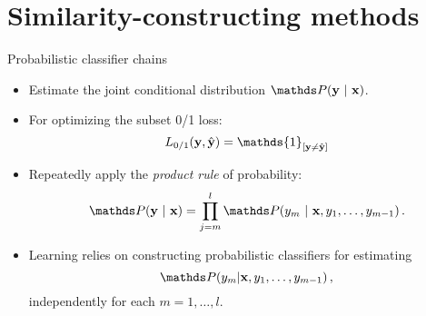 \documentclass[11pt,compress,t,notes=noshow, xcolor=table]{beamer}
\begin{document}
\section{Similarity-constructing methods}

\begin{frame}{Probabilistic classifier chains}
	
	\begin{itemize}
		\item Estimate the \alert{joint} conditional distribution $\P(\yv ~|~  \xv)$. 
		\item For optimizing the \alert{subset 0/1} loss:  $$ L_{0/1}(\yv, \hat{\yv}) = \mathds{1}_{[\yv \ne \hat{\yv}]}$$
		\item Repeatedly apply the \emph{product rule} of probability:
		$$
		\P(\yv ~|~ \xv) = \prod_{j=m}^{l} \P(y_m ~|~ \xv, y_1, \ldots,y_{m-1}) \, .
		$$
		\item  Learning relies on constructing \alert{probabilistic classifiers} for estimating 
		$$
		\P( y_m|\xv, y_1, \ldots,y_{m-1}) \,,
		$$
		{independently} for each $m = 1, \ldots, l$. 
	\end{itemize}
\end{frame}
\end{document}

